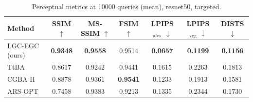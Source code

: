 \begin{table}[t]
\centering\footnotesize
\caption{Perceptual metrics at 10000 queries (mean), resnet50, targeted.}
\begin{tabular}{lcccccc}
\toprule
Method & SSIM $\uparrow$ & MS-SSIM $\uparrow$ & FSIM $\uparrow$ & LPIPS$_{\mathrm{alex}}$ $\downarrow$ & LPIPS$_{\mathrm{vgg}}$ $\downarrow$ & DISTS $\downarrow$ \\
\midrule
LGC-EGC (ours) & \textbf{0.9348} & \textbf{0.9558} & 0.9514 & \textbf{0.0657} & \textbf{0.1199} & \textbf{0.1156} \\
TtBA & 0.8617 & 0.9242 & 0.9441 & 0.1615 & 0.2263 & 0.1813 \\
CGBA-H & 0.8878 & 0.9361 & \textbf{0.9541} & 0.1233 & 0.1913 & 0.1581 \\
ARS-OPT & 0.7458 & 0.9383 & 0.9213 & 0.1335 & 0.2344 & 0.1730 \\
\bottomrule
\end{tabular}
\end{table}

